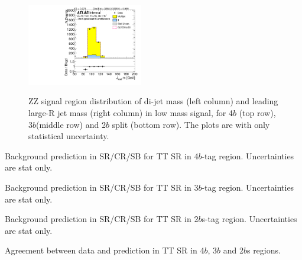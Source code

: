 \begin{figure}[htbp!]
\begin{center}
\includegraphics[angle=270, width=0.45\textwidth]{./figures/boosted/ZZ/Moriond_ZZ_TwoTag_split_Signal_leadHCand_Mass_s.pdf}\\
\end{center}
\caption{ZZ signal region distribution of di-jet mass (left column) and leading large-R jet mass (right column) in low mass signal, for 4$b$ (top row), 3$b$(middle row) and 2$b$ split (bottom row). The plots are with only statistical uncertainty.}
\label{CRSB:ZZSR_Distribution}
\end{figure}

\begin{table}[htbp!]
\begin{center}

\end{center}
\caption{Background prediction in SR/CR/SB for TT SR in 4$b$-tag region. Uncertainties are stat only.}
\label{CRSB:SummaryTable_TT_4b}
\end{table}

\begin{table}[htbp!]
\begin{center}

\end{center}
\caption{Background prediction in SR/CR/SB for TT SR in 3$b$-tag region. Uncertainties are stat only.}
\label{CRSB:SummaryTable_TT_3b}
\end{table}

\begin{table}[htbp!]
\begin{center}

\end{center}
\caption{Background prediction in SR/CR/SB for TT SR in 2$b$s-tag region. Uncertainties are stat only.}
\label{CRSB:SummaryTable_TT_2b}
\end{table}

\begin{table}[htbp!]
\begin{center}

\end{center}
\caption{Agreement between data and prediction in TT SR in 4$b$, 3$b$ and 2$b$s regions.}
\label{CRSB:DataPred_TTSR}
\end{table}


